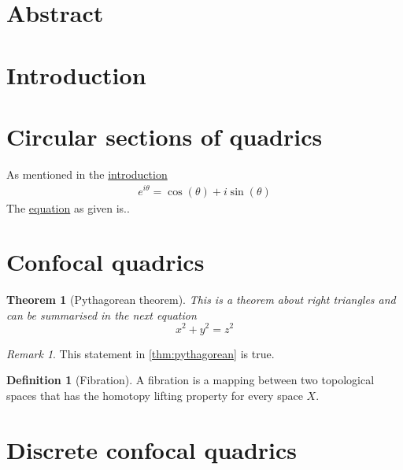 \documentclass[12pt,a4paper]{article}
\newtheorem{theorem}{Theorem}[section]
\theoremstyle{definition}
\newtheorem{definition}{Definition}[section]
\theoremstyle{remark}
\newtheorem*{remark}{Remark}
\begin{document}
\pagestyle{fancy}
\section*{Abstract} \label{sec:abstract}
\pagebreak
\pagestyle{tocstyle}
\renewcommand{\contentsname}{Contents}
\tableofcontents
\pagebreak
\pagestyle{fancy}
\section{Introduction} \label{sec:introduction}
\pagebreak
\section{Circular sections of quadrics}
As mentioned in the \hyperref[sec:introduction]{introduction}
\begin{align} \label{eq:Euler}
    e^{i \theta} = \cos(\theta)+i\sin(\theta)
\end{align}
The \hyperref[eq:Euler]{equation} as given is..
\pagebreak
\section{Confocal quadrics}
\begin{theorem}[Pythagorean theorem]
\label{thm:pythagorean}
This is a theorem about right triangles and can be summarised in the next
equation
\[ x^2 + y^2 = z^2 \]
\end{theorem}
\begin{remark}
This statement in \autoref{thm:pythagorean} is true.
\end{remark}

\begin{definition}[Fibration]
\label{def:fibration}
A fibration is a mapping between two topological spaces that has the homotopy lifting property for every space \(X\).
\end{definition}
\pagebreak
\section{Discrete confocal quadrics}
\pagebreak
\end{document}
